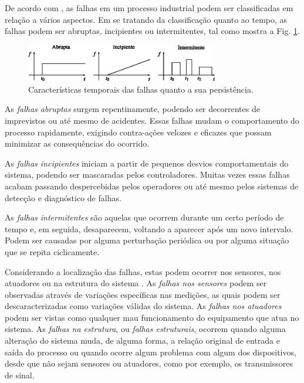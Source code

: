 De acordo com , as falhas em um processo industrial podem
ser classificadas em relação a vários aspectos. Em se tratando da classificação
quanto ao tempo, as falhas podem ser abruptas, incipientes ou intermitentes, tal
como mostra a Fig. \ref{fig:tipos_falha}.

\begin{figure}[H]
\centering
    \includegraphics[width=0.75\textwidth]{imgs/aspectos/eps/tipos_falha}
    \caption{Características temporais das falhas quanto a sua persistência.}
    \label{fig:tipos_falha}
\end{figure}

As {\it falhas abruptas} surgem repentinamente, podendo ser decorrentes de
imprevistos ou até mesmo de acidentes. Essas falhas mudam o comportamento do
processo rapidamente, exigindo contra-ações velozes e eficazes que possam
minimizar as consequências do ocorrido.

As {\it falhas incipientes} iniciam a partir de pequenos desvios comportamentais
do sistema, podendo ser mascaradas pelos controladores.  Muitas vezes essas
falhas acabam passando despercebidas pelos operadores ou até mesmo pelos
sistemas de detecção e diagnóstico de falhas.

As {\it falhas intermitentes} são aquelas que ocorrem durante um certo período
de tempo e, em seguida, desaparecem, voltando a aparecer após um novo intervalo.
Podem ser causadas por alguma perturbação periódica ou por alguma situação que
se repita ciclicamente.

Considerando a localização das falhas, estas podem ocorrer nos sensores, nos
atuadores ou na estrutura do sistema \cite{silva:2008}. As {\it falhas nos
sensores} podem ser observadas através de variações específicas nas medições, as
quais podem ser descaracterizadas como variações válidas do sistema. As {\it
falhas nos atuadores} podem ser vistas como qualquer mau funcionamento do
equipamento que atua no sistema. As {\it falhas na estrutura}, ou {\it falhas
estruturais}, ocorrem quando alguma alteração do sistema muda, de alguma forma,
a relação original de entrada e saída do processo ou quando ocorre algum
problema com algum dos dispositivos, desde que não sejam sensores ou atuadores,
como por exemplo, os transmissores de sinal.

